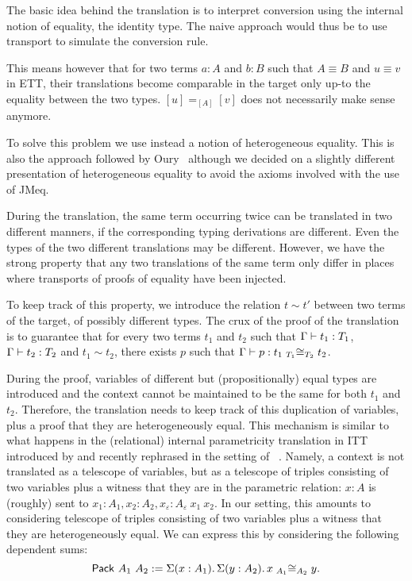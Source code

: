 The basic idea behind the translation is to interpret conversion using the
internal notion of equality, \ie the identity type.
The naive approach would thus be to use transport to simulate the conversion
rule.

This means however that for two terms \(a : A\) and \(b : B\) such that
\(A \equiv B\) and \(u \equiv v\) in \acrshort{ETT}, their translations
become comparable in the target only up-to the equality
between the two types. \([u] =_{[A]} [v]\) does not necessarily make sense
anymore.

To solve this problem we use instead a notion of heterogeneous equality.
This is also the approach followed by
Oury~
although we decided on a slightly different presentation of heterogeneous
equality to avoid the axioms involved with the use of \acrshort{JMeq}.

During the translation, the same term occurring twice can be
translated in two different manners, if the corresponding typing
derivations are different. Even the types of the two different
translations may be different.
%
However, we have the strong property that any two translations of the
same term only differ in places where transports of proofs of equality have been
injected.

To keep track of this property, we introduce the relation $t \sim t'$
between two terms of the target, of possibly different
types.
%
The crux of the proof of the translation is to guarantee that for
every two terms $t_1$ and $t_2$ such that $\isterm{\Ga}{t_1}{T_1}$,
$\isterm{\Ga}{t_2}{T_2}$ and $t_1 \sim t_2$, there exists $p$ such that
$\isterm{\Ga} {p} {\Heq{{T_1}} {{t_1}} {{T_2}} {{t_2}}}$.

During the proof, variables of different but (propositionally) equal
types are introduced and the context cannot be maintained to be the same
for both $t_1$ and $t_2$. Therefore, the translation needs to keep
track of this duplication of variables, plus a proof that they are
heterogeneously equal.
%
This mechanism is similar to what happens in the (relational) internal
parametricity translation in \acrshort{ITT} introduced by
 and recently rephrased in the setting of
\MetaCoq~. Namely, a context is not
translated as a telescope of variables, but as a telescope of triples
consisting of two variables plus a witness that they are in the
parametric relation: \(x : A\) is (roughly) sent to
\(x_1 : A_1, x_2 : A_2, x_\varepsilon : A_\varepsilon\ x_1\ x_2\).
%
In our setting, this amounts to considering telescope of triples
consisting of two variables plus a witness that they are
heterogeneously equal. We can express this by considering the
following dependent sums:
\[
\Pack{A_1}{A_2} := \Sum{x:A_1} \Sum{y:A_2} \Heq{A_1}{x}{A_2}{y}.
\]

